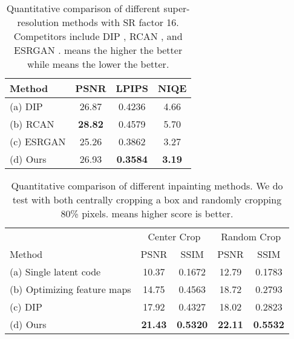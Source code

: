 \documentclass[10pt,twocolumn,letterpaper]{article}
\begin{document}
\setlength{\tabcolsep}{12pt}
\begin{table}[t]
  \centering
  \footnotesize
  \captionsetup{font=small}
  \caption{
    Quantitative comparison of different super-resolution methods with SR factor 16.
Competitors include DIP \cite{ulyanov2018deep}, RCAN \cite{rcan}, and ESRGAN \cite{wang2018esrgan}.
 means the higher the better while  means the lower the better.
  }
  \label{tab:super-resolution}
  \vspace{-8pt}
  \begin{tabular}{lccc}
    \hline
    Method                           & PSNR & LPIPS & NIQE \\
    \hline
    (a) DIP \cite{ulyanov2018deep}   & 26.87          & 0.4236            & 4.66 \\
    (b) RCAN \cite{rcan}             & \bf 28.82      & 0.4579            & 5.70 \\
    (c) ESRGAN \cite{wang2018esrgan} & 25.26          & 0.3862            & 3.27 \\
    (d) Ours                         & 26.93          & \bf 0.3584        & \bf 3.19 \\
    \hline
  \end{tabular}
  \vspace{-5pt}
\end{table}


\setlength{\tabcolsep}{3.5pt}
\begin{table}[t]
  \centering
  \footnotesize
  \captionsetup{font=small}
  \caption{
    Quantitative comparison of different inpainting methods.
We do test with both centrally cropping a  box and randomly cropping 80\% pixels.
 means higher score is better.
  }
  \label{tab:inpainting}
  \vspace{-8pt}
  \begin{tabular}{lcccc}
    \hline
    & \multicolumn{2}{c}{Center Crop}  & \multicolumn{2}{c}{Random Crop} \\
    \cmidrule(lr){2-3} \cmidrule(lr){4-5}
    Method                                                        & PSNR & SSIM & PSNR & SSIM \\
    \hline
    (a) Single latent code \cite{lipton2017precise,invertibility} & 10.37           & 0.1672         & 12.79          & 0.1783 \\
    (b) Optimizing feature maps \cite{bau2019semantic}            & 14.75           & 0.4563         & 18.72          & 0.2793 \\
    (c) DIP \cite{ulyanov2018deep}                                & 17.92           & 0.4327         & 18.02          & 0.2823 \\
    (d) Ours                                                      & \bf 21.43       & \bf 0.5320     & \bf 22.11      & \bf 0.5532 \\
    \hline
  \end{tabular}
  \vspace{-25pt}
\end{table}
\end{document}
